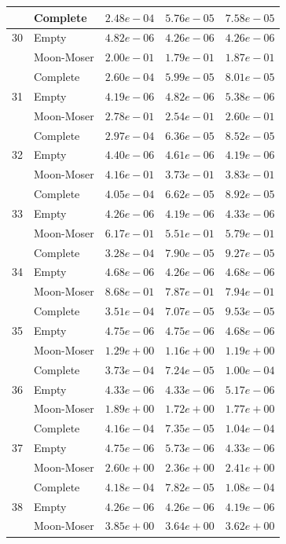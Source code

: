 \documentclass[12pt,a4paper]{article}
\begin{document}
\begin{longtable}{|l||l|l|l|l|}
  & Complete & $2.48e-04$ & $5.76e-05$ & $7.58e-05$ \\
  \hline
  30 & Empty & $4.82e-06$ & $4.26e-06$ & $4.26e-06$ \\
  & Moon-Moser & $2.00e-01$ & $1.79e-01$ & $1.87e-01$ \\
  & Complete & $2.60e-04$ & $5.99e-05$ & $8.01e-05$ \\
  \hline
  31 & Empty & $4.19e-06$ & $4.82e-06$ & $5.38e-06$ \\
  & Moon-Moser & $2.78e-01$ & $2.54e-01$ & $2.60e-01$ \\
  & Complete & $2.97e-04$ & $6.36e-05$ & $8.52e-05$ \\
  \hline
  32 & Empty & $4.40e-06$ & $4.61e-06$ & $4.19e-06$ \\
  & Moon-Moser & $4.16e-01$ & $3.73e-01$ & $3.83e-01$ \\
  & Complete & $4.05e-04$ & $6.62e-05$ & $8.92e-05$ \\
  \hline
  33 & Empty & $4.26e-06$ & $4.19e-06$ & $4.33e-06$ \\
  & Moon-Moser & $6.17e-01$ & $5.51e-01$ & $5.79e-01$ \\
  & Complete & $3.28e-04$ & $7.90e-05$ & $9.27e-05$ \\
  \hline
  34 & Empty & $4.68e-06$ & $4.26e-06$ & $4.68e-06$ \\
  & Moon-Moser & $8.68e-01$ & $7.87e-01$ & $7.94e-01$ \\
  & Complete & $3.51e-04$ & $7.07e-05$ & $9.53e-05$ \\
  \hline
  35 & Empty & $4.75e-06$ & $4.75e-06$ & $4.68e-06$ \\
  & Moon-Moser & $1.29e+00$ & $1.16e+00$ & $1.19e+00$ \\
  & Complete & $3.73e-04$ & $7.24e-05$ & $1.00e-04$ \\
  \hline
  36 & Empty & $4.33e-06$ & $4.33e-06$ & $5.17e-06$ \\
  & Moon-Moser & $1.89e+00$ & $1.72e+00$ & $1.77e+00$ \\
  & Complete & $4.16e-04$ & $7.35e-05$ & $1.04e-04$ \\
  \hline
  37 & Empty & $4.75e-06$ & $5.73e-06$ & $4.33e-06$ \\
  & Moon-Moser & $2.60e+00$ & $2.36e+00$ & $2.41e+00$ \\
  & Complete & $4.18e-04$ & $7.82e-05$ & $1.08e-04$ \\
  \hline
  38 & Empty & $4.26e-06$ & $4.26e-06$ & $4.19e-06$ \\
  & Moon-Moser & $3.85e+00$ & $3.64e+00$ & $3.62e+00$ \\

\end{longtable}
\end{document}
